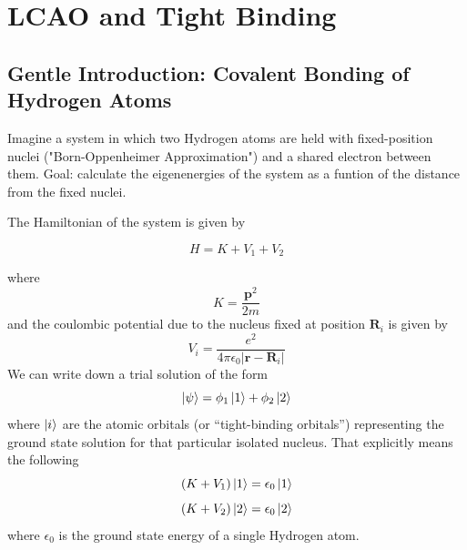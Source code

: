 \documentclass[10pt]{article}
\begin{document}
\maketitle

\section{LCAO and Tight Binding}
\subsection{Gentle Introduction: Covalent Bonding of Hydrogen Atoms}
Imagine a system in which two Hydrogen atoms are held with fixed-position nuclei
("Born-Oppenheimer Approximation") and a shared electron between them.
Goal: calculate the eigenenergies of the system as a funtion of the distance from the fixed nuclei.


The Hamiltonian of the system is given by

$$
H = K + V_{1} + V_{2}
$$

where
$$
K = \frac{\textbf{p}^{2}}{2m}
$$
and the coulombic potential due to the nucleus fixed at position $\textbf{R}_{i}$ is given by
$$
V_{i} = \frac{e^{2}}{4\pi\epsilon_{0}|\textbf{r} - \textbf{R}_{i}|}
$$
We can write down a trial solution of the form
$$
\ket{\psi} = \phi_{1}\ket{1} + \phi_{2}\ket{2}
$$
where $\ket{i}$ are the atomic orbitals (or ``tight-binding orbitals'') representing the
ground state solution for that particular isolated nucleus. That explicitly means the following
$$
(K + V_{1})\ket{1} = \epsilon_{0}\ket{1}
$$
$$
(K + V_{2})\ket{2} = \epsilon_{0}\ket{2}
$$
where $\epsilon_{0}$ is the ground state energy of a single Hydrogen atom.
\end{document}
